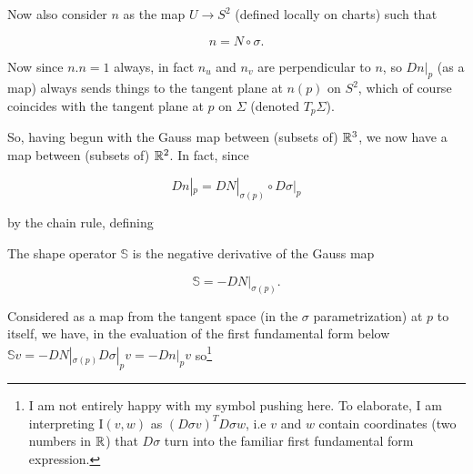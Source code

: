 \documentclass[11pt]{scrartcl}
\begin{document}
Now also consider $n$ as the map $U \rightarrow S^2$ (defined locally on charts) such that 

\begin{equation}
    n = N \circ \sigma.
\end{equation}

Now since $n . n = 1$ always, in fact $n_u$ and $n_v$ are perpendicular to $n$, so $Dn|_p$ (as a map) always sends things to the tangent plane at $n(p)$ on $S^2$, which of course coincides with the tangent plane at $p$ on $\Sigma$ (denoted $T_p \Sigma$).

So, having begun with the Gauss map between (subsets of) $\mathbb R^3$, we now have a map between (subsets of) $\mathbb R^2$. In fact, since 

\begin{equation}
    Dn|_p = DN|_{\sigma(p)} \circ D\sigma|_p
\end{equation}

by the chain rule, defining

\begin{definition}

\label{shape definition}

The shape operator $\mathbb{S}$ is the negative derivative of the Gauss map 

\begin{equation}
    \mathbb{S} = - D N|_{\sigma (p)}.
\end{equation}

\end{definition}

Considered as a map from the tangent space (in the $\sigma$ parametrization) at $p$ to itself, we have, in the evaluation of the first fundamental form below $\mathbb{S}v = -DN|_{\sigma (p)} D \sigma|_p v = - Dn|_p v$ so\footnote{I am not entirely happy with my symbol pushing here. To elaborate, I am interpreting $\text{I}(v,w)$ as $(D \sigma v)^T D \sigma w$, i.e $v$ and $w$ contain coordinates (two numbers in $\mathbb R$) that $D\sigma$ turn into the familiar first fundamental form expression.}
\end{document}
